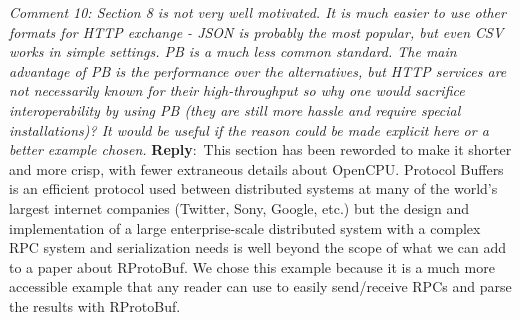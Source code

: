\documentclass[10pt]{article}
\newcommand{\pointRaised}[2]{\smallskip %
  \textsl{{\fontseries{b}\selectfont #1}: #2}\newline}
\newcommand{\reply}[1]{\textbf{Reply}:\ #1 \smallskip } %
\begin{document}
\pointRaised{Comment 10}{Section 8 is not very well motivated. It is much easier to use other 
  formats for HTTP exchange - JSON is probably the most popular, but even
  CSV works in simple settings. PB is a much less common standard. The 
  main advantage of PB is the performance over the alternatives, but HTTP
  services are not necessarily known for their high-throughput so why one
  would sacrifice interoperability by using PB (they are still more hassle 
  and require special installations)? It would be useful if the reason 
  could be made explicit here or a better example chosen.}
\reply{This section has been reworded to make it shorter and more
  crisp, with fewer extraneous details about OpenCPU.
Protocol
  Buffers is an efficient protocol used between distributed systems at
  many of the world's largest internet companies (Twitter, Sony,
  Google, etc.) but the design and implementation of a large
  enterprise-scale distributed system with a complex RPC system and
  serialization needs is well beyond the scope of what we can add to a
  paper about RProtoBuf.  We chose this example because it is a much
  more accessible example that any reader can use to easily
  send/receive RPCs and parse the results with RProtoBuf.}
\end{document}
